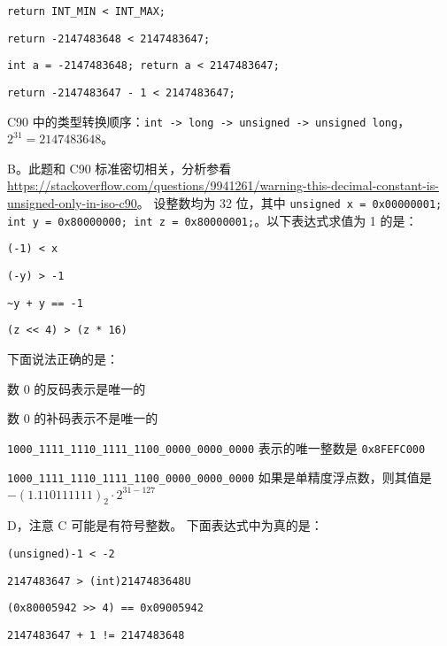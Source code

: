\begin{problems}
        \begin{choices}
            \item \verb|return INT_MIN < INT_MAX;|
            \item \verb|return -2147483648 < 2147483647;|
            \item \verb|int a = -2147483648; return a < 2147483647;|
            \item \verb|return -2147483647 - 1 < 2147483647;|
        \end{choices}
        \begin{hint}
            C90 中的类型转换顺序：\texttt{int -> long -> unsigned -> unsigned long}，$2^{31}=2147483648$。
        \end{hint}
        \sol B。此题和 C90 标准密切相关，分析参看 \url{https://stackoverflow.com/questions/9941261/warning-this-decimal-constant-is-unsigned-only-in-iso-c90}。
         设整数均为 32 位，其中 \texttt{unsigned x = 0x00000001; int y = 0x80000000; int z = 0x80000001;}。以下表达式求值为 1 的是：
        \begin{choices}
            \item \verb|(-1) < x|
            \item \verb|(-y) > -1|
            \item \verb|~y + y == -1|
            \item \verb|(z << 4) > (z * 16)|
        \end{choices}
         下面说法正确的是：
        \begin{choices}
            \item 数 0 的反码表示是唯一的
            \item 数 0 的补码表示不是唯一的
            \item \verb|1000_1111_1110_1111_1100_0000_0000_0000| 表示的唯一整数是 \texttt{0x8FEFC000}
            \item \verb|1000_1111_1110_1111_1100_0000_0000_0000| 如果是单精度浮点数，则其值是 $-(1.110111111)_2 \cdot 2^{31-127}$
        \end{choices}
        \sol D，注意 C 可能是有符号整数。
         下面表达式中为真的是：
        \begin{choices}
            \item \verb|(unsigned)-1 < -2|
            \item \verb|2147483647 > (int)2147483648U|
            \item \verb|(0x80005942 >> 4) == 0x09005942|
            \item \verb|2147483647 + 1 != 2147483648|

\end{choices}
\end{problems}
